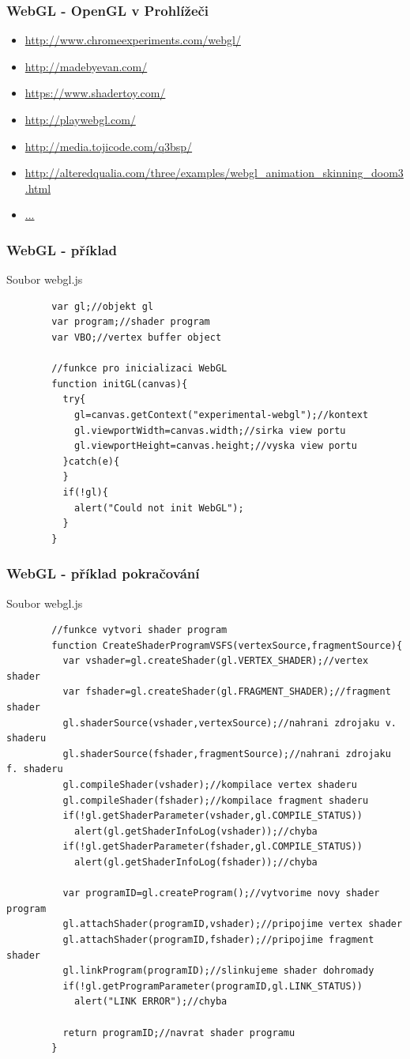 \begin{frame}
\frametitle{WebGL - OpenGL v Prohlížeči}
	\begin{itemize}
	\item \url{http://www.chromeexperiments.com/webgl/}
	\item \url{http://madebyevan.com/}
	\item \url{https://www.shadertoy.com/}
	\item \url{http://playwebgl.com/}
	\item \url{http://media.tojicode.com/q3bsp/}
	\item \url{http://alteredqualia.com/three/examples/webgl_animation_skinning_doom3.html}
	\item \url{...}
	\end{itemize}
\end{frame}

\begin{frame}[fragile]
\frametitle{WebGL - příklad}
		Soubor webgl.js
		{\scriptsize
		\begin{verbatim}
		var gl;//objekt gl
		var program;//shader program
		var VBO;//vertex buffer object

		//funkce pro inicializaci WebGL
		function initGL(canvas){
		  try{
		    gl=canvas.getContext("experimental-webgl");//kontext
		    gl.viewportWidth=canvas.width;//sirka view portu
		    gl.viewportHeight=canvas.height;//vyska view portu
		  }catch(e){
		  }
		  if(!gl){
		    alert("Could not init WebGL");
		  }
		}
		\end{verbatim}
		}
\end{frame}

\begin{frame}[fragile]
\frametitle{WebGL - příklad pokračování}
		Soubor webgl.js
		{\scriptsize
		\begin{verbatim}
		//funkce vytvori shader program
		function CreateShaderProgramVSFS(vertexSource,fragmentSource){
		  var vshader=gl.createShader(gl.VERTEX_SHADER);//vertex shader
		  var fshader=gl.createShader(gl.FRAGMENT_SHADER);//fragment shader
		  gl.shaderSource(vshader,vertexSource);//nahrani zdrojaku v. shaderu
		  gl.shaderSource(fshader,fragmentSource);//nahrani zdrojaku f. shaderu
		  gl.compileShader(vshader);//kompilace vertex shaderu
		  gl.compileShader(fshader);//kompilace fragment shaderu
		  if(!gl.getShaderParameter(vshader,gl.COMPILE_STATUS))
		    alert(gl.getShaderInfoLog(vshader));//chyba
		  if(!gl.getShaderParameter(fshader,gl.COMPILE_STATUS))
		    alert(gl.getShaderInfoLog(fshader));//chyba

		  var programID=gl.createProgram();//vytvorime novy shader program
		  gl.attachShader(programID,vshader);//pripojime vertex shader
		  gl.attachShader(programID,fshader);//pripojime fragment shader
		  gl.linkProgram(programID);//slinkujeme shader dohromady
		  if(!gl.getProgramParameter(programID,gl.LINK_STATUS))
		    alert("LINK ERROR");//chyba

		  return programID;//navrat shader programu
		}
		\end{verbatim}
		}
\end{frame}

